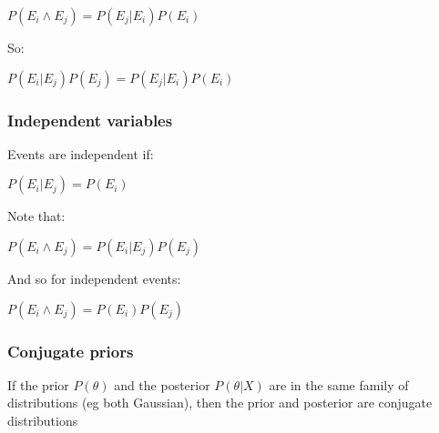 \(P(E_i\land E_j)=P(E_j|E_i)P(E_i)\)

So:

\(P(E_i|E_j)P(E_j)=P(E_j|E_i)P(E_i)\)

\subsubsection{Independent variables}

Events are independent if:

\(P(E_i|E_j)=P(E_i)\)

Note that:

\(P(E_i\land E_j)=P(E_i|E_j)P(E_j)\)

And so for independent events:

\(P(E_i\land E_j)=P(E_i)P(E_j)\)

\subsubsection{Conjugate priors}

If the prior \(P(\theta)\) and the posterior \(P(\theta | X)\) are in the same family of distributions (eg both Gaussian), then the prior and posterior are conjugate distributions

